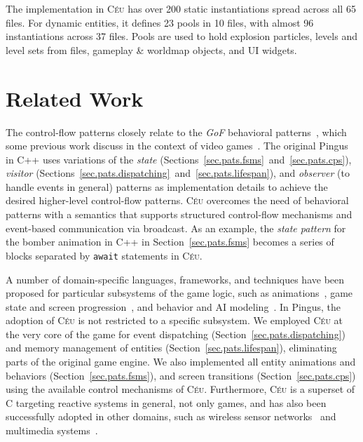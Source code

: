 \documentclass{vgtc}                          %
\newcommand{\CEU}{\textsc{C\'{e}u}\xspace}
\newcommand{\code}[1] {{\small{\texttt{#1}}}}
\begin{document}
The implementation in \CEU has over 200 static instantiations spread across all
65 files.
For dynamic entities, it defines 23 pools in 10 files, with almost 96
instantiations across 37 files.
Pools are used to hold explosion particles, levels and level sets from files,
gameplay \& worldmap objects, and UI widgets.

\section{Related Work}
\label{sec.related}

The control-flow patterns closely relate to the \emph{GoF} behavioral
patterns~\cite{gof}, which some previous work discuss in the context of video
games~\cite{games.patterns,games.gof.2015,games.gof.2007}.
%
The original Pingus in C++ uses variations of the
    \emph{state} (Sections~\ref{sec.pats.fsms}~and~\ref{sec.pats.cps}),
    \emph{visitor} (Sections~\ref{sec.pats.dispatching}~and~\ref{sec.pats.lifespan}), and
    \emph{observer} (to handle events in general)
patterns as implementation details to achieve the desired higher-level
control-flow patterns.
%
\CEU overcomes the need of behavioral patterns with a semantics that supports
structured control-flow mechanisms and event-based communication via broadcast.
%
As an example, the \emph{state pattern} for the bomber animation in C++ in
Section~\ref{sec.pats.fsms} becomes a series of blocks separated by
\code{await} statements in \CEU.

A number of domain-specific languages, frameworks, and techniques have been
proposed for particular subsystems of the game logic, such as
animations~\cite{games.anims.2006,games.anims.2003,games.anims.1996,games.anims.1982},
game state and screen progression~\cite{games.fsms.2006.1,games.fsms.2006.2}, and
behavior and AI modeling~\cite{games.bts,games.bts.unreal}.
%
In Pingus, the adoption of \CEU is not restricted to a specific subsystem.
We employed \CEU at the very core of the game for event dispatching
(Section~\ref{sec.pats.dispatching}) and memory management of entities
(Section~\ref{sec.pats.lifespan}), eliminating parts of the original game
engine.
We also implemented all entity animations and behaviors
(Section~\ref{sec.pats.fsms}), and screen transitions
(Section~\ref{sec.pats.cps})
using the available control mechanisms of \CEU.
%
Furthermore, \CEU is a superset of C targeting reactive systems in general, not
only games, and has also been successfully adopted in other domains, such as
    wireless sensor networks~\cite{ceu.sensys13,ceu.terra} and
    multimedia systems~\cite{ceu.media.webmedia16}.
\end{document}
